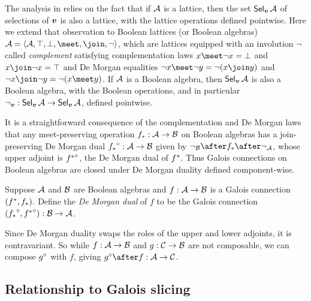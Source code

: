 
The analysis in  relies on the fact that if $\mathcal{A}$ is a lattice, then the set $\textup{\textsf{Sel}}_{\bm{v}}\,{\mathcal{A}}$ of selections of $\bm{v}$ is also a lattice, with the lattice operations defined pointwise. Here we extend that observation to Boolean lattices (or Boolean algebras) $\Ann{A}= \BoolLattice{\Ann{A}}{\top}{\bot}{\meet}{\join}{\neg}$, which are lattices equipped with an involution $\neg$ called \emph{complement} satisfying complementation laws $x \meet \neg x = \bot$ and $x \join \neg x = \top$ and De Morgan equalities $\neg x \meet \neg y = \neg(x \join y)$ and $\neg x \join \neg y = \neg(x \meet y)$. If $\mathcal{A}$ is a Boolean algebra, then $\textup{\textsf{Sel}}_{\bm{v}}\,{\mathcal{A}}$ is also a Boolean algebra, with the Boolean operations, and in particular $\neg_{\bm{v}}: \textup{\textsf{Sel}}_{\bm{v}}\,{\mathcal{A}} \to \textup{\textsf{Sel}}_{\bm{v}}\,{\mathcal{A}}$, defined pointwise.

It is a straightforward consequence of the complementation and De Morgan laws that any meet-preserving operation ${f}_*: \mathcal{A} \to \mathcal{B}$ on Boolean algebras has a join-preserving De Morgan dual ${{f}_*}^{\circ}: \mathcal{A} \to \mathcal{B}$ given by $\neg_{\Ann{B}} \after \upperAdj{f} \after \neg_{\Ann{A}}$, whose upper adjoint is ${{f}^*}^{\circ}$, the De Morgan dual of ${f}^*$. Thus Galois connections on Boolean algebras are closed under De Morgan duality defined component-wise.

\begin{definition}
   Suppose $\mathcal{A}$ and $\mathcal{B}$ are Boolean algebras and $f: \mathcal{A} \to \mathcal{B}$ is a Galois connection $({f}^*,{f}_*)$. Define the \emph{De Morgan dual} of $f$ to be the Galois connection $({{f}_*}^{\circ}, {{f}^*}^{\circ}): \mathcal{B} \to \mathcal{A}$.
\end{definition}

\noindent Since De Morgan duality swaps the roles of the upper and lower adjoints, it is contravariant. So while $f: \mathcal{A} \to \mathcal{B}$ and $g: \mathcal{C} \to \mathcal{B}$ are not composable, we can compose ${g}^{\circ}$ with $f$, giving $\dual{g} \after f: \Ann{A} \to \Ann{C}$.



\subsection{Relationship to Galois slicing}

